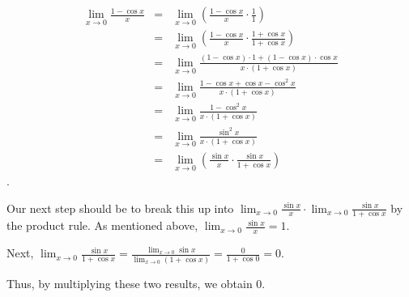 \documentclass[]{article}
\begin{document}
\begin{itemize}
	\begin{align}\lim_{x\to 0} \frac{1-\cos x}{x} &=& \lim_{x\to 0} \left(\frac{1-\cos x}{x} \cdot \frac{1}{1}\right) \\
	&=& \lim_{x\to 0} \left(\frac{1-\cos x}{x} \cdot \frac{1 + \cos x} {1+ \cos x}\right) \\
	&=& \lim_{x\to 0}\frac{(1 - \cos x) \cdot 1 + (1 - \cos x) \cdot \cos x} {x \cdot (1+ \cos x)} \\
	&=& \lim_{x\to 0}\frac{1 - \cos x + \cos x - \cos^2 x}{x \cdot (1+ \cos x)} \\
	&=& \lim_{x\to 0}\frac{1 - \cos^2 x} {x \cdot (1+ \cos x)} \\
	&=& \lim_{x\to 0}\frac{\sin^2 x} {x \cdot (1+ \cos x)} \\
	&=& \lim_{x\to 0} \left(\frac{\sin x} {x} \cdot \frac{\sin x} {1+ \cos x}\right)\end{align} \nonumber.
	
	Our next step should be to break this up into $\lim_{x\to 0}\frac{\sin x}{x} \cdot \lim_{x\to 0} \frac{\sin x}{1+\cos x}$ by the product rule. As mentioned above, $\lim_{x\to 0} \frac{\sin x} {x} = 1.$
	
	Next, $ \lim_{x\to 0} \frac{\sin x} {1+\cos x} = \frac{\lim_{x\to 0}\sin x} {\lim_{x\to 0} (1+\cos x)} = \frac{0} {1 + \cos 0} = 0$.
	
	Thus, by multiplying these two results, we obtain 0.
	
\end{itemize}	


\end{document}
